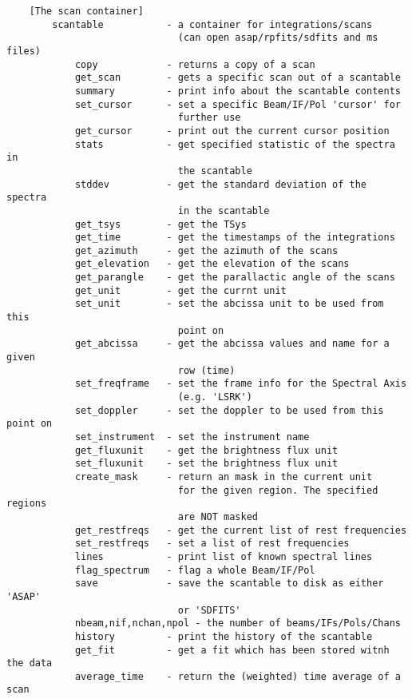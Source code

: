 \documentclass[11pt]{article}
\begin{document}
%
\begin{verbatim}
    [The scan container]
        scantable           - a container for integrations/scans
                              (can open asap/rpfits/sdfits and ms files)
            copy            - returns a copy of a scan
            get_scan        - gets a specific scan out of a scantable
            summary         - print info about the scantable contents
            set_cursor      - set a specific Beam/IF/Pol 'cursor' for
                              further use
            get_cursor      - print out the current cursor position
            stats           - get specified statistic of the spectra in
                              the scantable
            stddev          - get the standard deviation of the spectra
                              in the scantable
            get_tsys        - get the TSys
            get_time        - get the timestamps of the integrations
            get_azimuth     - get the azimuth of the scans
            get_elevation   - get the elevation of the scans
            get_parangle    - get the parallactic angle of the scans
            get_unit        - get the currnt unit
            set_unit        - set the abcissa unit to be used from this
                              point on
            get_abcissa     - get the abcissa values and name for a given
                              row (time)
            set_freqframe   - set the frame info for the Spectral Axis
                              (e.g. 'LSRK')
            set_doppler     - set the doppler to be used from this point on
            set_instrument  - set the instrument name
            get_fluxunit    - get the brightness flux unit
            set_fluxunit    - set the brightness flux unit
            create_mask     - return an mask in the current unit
                              for the given region. The specified regions
                              are NOT masked
            get_restfreqs   - get the current list of rest frequencies
            set_restfreqs   - set a list of rest frequencies
            lines           - print list of known spectral lines
            flag_spectrum   - flag a whole Beam/IF/Pol
            save            - save the scantable to disk as either 'ASAP'
                              or 'SDFITS'
            nbeam,nif,nchan,npol - the number of beams/IFs/Pols/Chans
            history         - print the history of the scantable
            get_fit         - get a fit which has been stored witnh the data
            average_time    - return the (weighted) time average of a scan

\end{verbatim}
\end{document}
